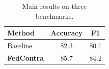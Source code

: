 \begin{table}[htbp]
\centering
\caption{Main results on three benchmarks.}
\label{tab:main}
\begin{tabular}{lcc}
\toprule
Method & Accuracy & F1 \\
\midrule
Baseline & 82.3 & 80.1 \\
\textbf{FedContra} & 85.7 & 84.2 \\
\bottomrule
\end{tabular}
\end{table}
